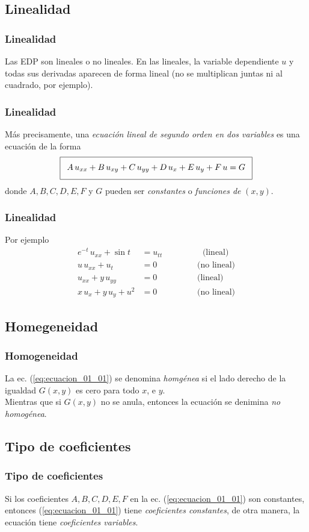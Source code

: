 \subsection*{Linealidad}
\begin{frame}
\frametitle{Linealidad}
Las EDP son lineales o no lineales. En las lineales, la variable dependiente $u$ y todas sus derivadas aparecen de forma lineal (no se multiplican juntas ni al cuadrado, por ejemplo).
\end{frame}
\begin{frame}
\frametitle{Linealidad}
Más precisamente, una \emph{ecuación lineal de segundo orden en dos variables} es una ecuación de la forma
\begin{align}
\addtolength{\fboxsep}{5pt}\boxed{ A \, u_{xx} + B \, u_{xy} + C \, u_{yy} + D \, u_{x} + E \, u_{y} + F \, u = G}
\label{eq:ecuacion_01_01}
\end{align}
donde $A, B, C, D, E, F$ y $G$ pueden ser \emph{constantes} o \emph{funciones de} $(x, y)$.
\end{frame}
\begin{frame}
\frametitle{Linealidad}
Por ejemplo
\begin{align*}
e^{-t} \, u_{xx} + \sin t &= u_{tt} \hspace{2cm} \mbox{(lineal)} \\[0.5em]
u \, u_{xx} + u_{t} &= 0 \hspace{2cm} \mbox{(no lineal)} \\[0.5em]
u_{xx} + y \, u_{yy} &= 0 \hspace{2cm} \mbox{(lineal)} \\[0.5em]
x \, u_{x} + y \, u_{y} + u^{2} &= 0 \hspace{2cm} \mbox{(no lineal)}
\end{align*}
\end{frame}
\subsection*{Homegeneidad}
\begin{frame}
\frametitle{Homogeneidad}
La ec. (\ref{eq:ecuacion_01_01}) se denomina \emph{homgénea} si el lado derecho de la igualdad $G(x, y)$ es cero para todo $x$, e $y$.
\\
\bigskip
Mientras que si $G(x, y)$ no se anula, entonces la ecuación se denimina \emph{no homogénea}.
\end{frame}
\subsection*{Tipo de coeficientes}
\begin{frame}
\frametitle{Tipo de coeficientes}
Si los coeficientes $A, B, C, D, E, F$ en la ec. (\ref{eq:ecuacion_01_01}) son constantes, entonces (\ref{eq:ecuacion_01_01}) tiene \emph{coeficientes constantes}, de otra manera, la ecuación tiene \emph{coeficientes variables}.
\end{frame}
